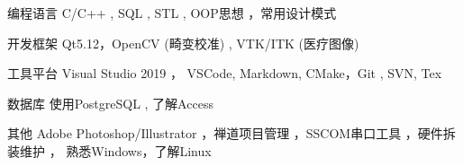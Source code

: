 
\begin{cvskills}

  \cvskill
    {编程语言} %
    {C/C++ , SQL ,  STL , OOP思想 ，常用设计模式} 

  \cvskill
    {开发框架}%
    {Qt5.12，OpenCV (畸变校准) ,  VTK/ITK (医疗图像)} 

  \cvskill
    {工具平台} %
    { Visual Studio 2019 ， VSCode, Markdown, CMake，Git , SVN, Tex} 

  \cvskill
    {数据库} %
    {使用PostgreSQL ,  了解Access} 

  \cvskill
    {其他} %
    {Adobe Photoshop/Illustrator ，禅道项目管理 ，SSCOM串口工具 ，硬件拆装维护 ， 熟悉Windows，了解Linux} 

\end{cvskills}
